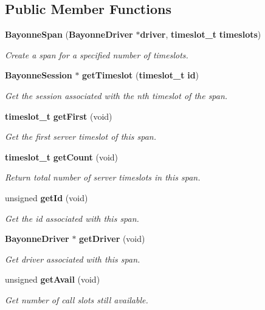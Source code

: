 \subsection*{Public Member Functions}
\begin{DoxyCompactItemize}
\item 
{\bf BayonneSpan} ({\bf BayonneDriver} $\ast${\bf driver}, {\bf timeslot\_\-t} {\bf timeslots})
\begin{DoxyCompactList}\small\item\em Create a span for a specified number of timeslots. \item\end{DoxyCompactList}\item 
{\bf BayonneSession} $\ast$ {\bf getTimeslot} ({\bf timeslot\_\-t} {\bf id})
\begin{DoxyCompactList}\small\item\em Get the session associated with the nth timeslot of the span. \item\end{DoxyCompactList}\item 
{\bf timeslot\_\-t} {\bf getFirst} (void)
\begin{DoxyCompactList}\small\item\em Get the first server timeslot of this span. \item\end{DoxyCompactList}\item 
{\bf timeslot\_\-t} {\bf getCount} (void)
\begin{DoxyCompactList}\small\item\em Return total number of server timeslots in this span. \item\end{DoxyCompactList}\item 
unsigned {\bf getId} (void)
\begin{DoxyCompactList}\small\item\em Get the id associated with this span. \item\end{DoxyCompactList}\item 
{\bf BayonneDriver} $\ast$ {\bf getDriver} (void)
\begin{DoxyCompactList}\small\item\em Get driver associated with this span. \item\end{DoxyCompactList}\item 
unsigned {\bf getAvail} (void)
\begin{DoxyCompactList}\small\item\em Get number of call slots still available. \item\end{DoxyCompactList}\item 

\end{DoxyCompactItemize}
